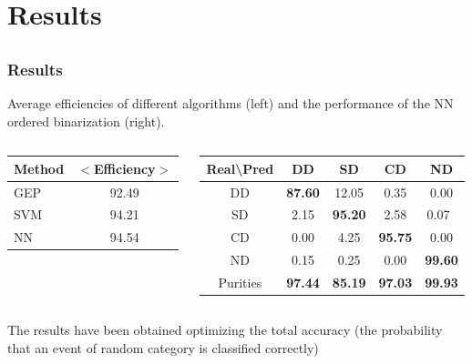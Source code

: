 \documentclass{beamer}
\begin{document}
\section{Results}
\subsection{}
\frame
{
  \frametitle{Results}

Average efficiencies of different algorithms (left) and the performance of the NN ordered binarization (right). 

\begin{columns}
\begin{column}{4cm}

{\scriptsize
\begin{table}
\hspace{1.0cm}
\begin{tabular}{l|c}
Method & $<$Efficiency$>$ \\ \hline
GEP & 92.49 \\
SVM & 94.21 \\
NN & 94.54 \\
\end{tabular}
\end{table}
}
\end{column}
\begin{column}{7cm}

\hspace{2.2cm}
{\scriptsize
\begin{table}
\begin{tabular}{c|cccc}
  Real\textbackslash Pred & DD & SD & CD & ND \\ \hline
  DD & {\bf 87.60} & 12.05 & 0.35 & 0.00 \\
  SD & 2.15 & {\bf 95.20} & 2.58 & 0.07 \\
  CD & 0.00 & 4.25 & {\bf 95.75} & 0.00 \\
  ND & 0.15 & 0.25 & 0.00 & {\bf 99.60} \\ \hline
  Purities &  {\bf 97.44} & {\bf 85.19} & {\bf 97.03} & {\bf 99.93}
\end{tabular}
\end{table}
}
\end{column}

\end{columns}

The results have been obtained optimizing the total accuracy
(the probability that an event of random category is classified correctly)
}
\end{document}
